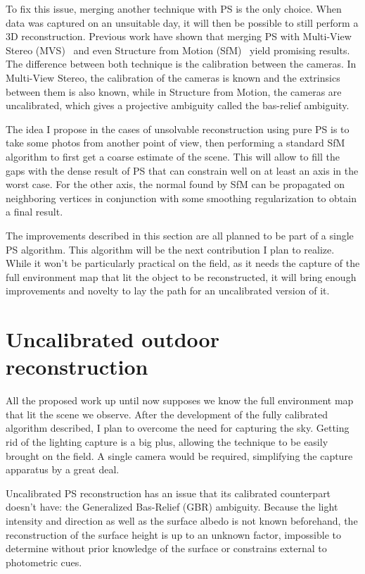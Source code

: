 To fix this issue, merging another technique with PS is the only choice. When data was captured on an unsuitable day, it will then be possible to still perform a 3D reconstruction. Previous work have shown that merging PS with Multi-View Stereo (MVS)~\cite{Beljan2012,Zhou2013,ackermann-3dv-14,HernandezEsteban2008,inose-tcva-13,shi-3dv-14} and even Structure from Motion (SfM)~\cite{zhang-iccv-03,lim-iccv-05} yield promising results. The difference between both technique is the calibration between the cameras. In Multi-View Stereo, the calibration of the cameras is known and the extrinsics between them is also known, while in Structure from Motion, the cameras are uncalibrated, which gives a projective ambiguity called the bas-relief ambiguity.

The idea I propose in the cases of unsolvable reconstruction using pure PS is to take some photos from another point of view, then performing a standard SfM algorithm to first get a coarse estimate of the scene. This will allow to fill the gaps with the dense result of PS that can constrain well on at least an axis in the worst case. For the other axis, the normal found by SfM can be propagated on neighboring vertices in conjunction with some smoothing regularization to obtain a final result.

The improvements described in this section are all planned to be part of a single PS algorithm. This algorithm will be the next contribution I plan to realize. While it won't be particularly practical on the field, as it needs the capture of the full environment map that lit the object to be reconstructed, it will bring enough improvements and novelty to lay the path for an uncalibrated version of it.

\section{Uncalibrated outdoor reconstruction}
\label{sec:uncalib}

All the proposed work up until now supposes we know the full environment map that lit the scene we observe. After the development of the fully calibrated algorithm described, I plan to overcome the need for capturing the sky. Getting rid of the lighting capture is a big plus, allowing the technique to be easily brought on the field. A single camera would be required, simplifying the capture apparatus by a great deal.

Uncalibrated PS reconstruction has an issue that its calibrated counterpart doesn't have: the Generalized Bas-Relief (GBR) ambiguity. Because the light intensity and direction as well as the surface albedo is not known beforehand, the reconstruction of the surface height is up to an unknown factor, impossible to determine without prior knowledge of the surface or constrains external to photometric cues.

